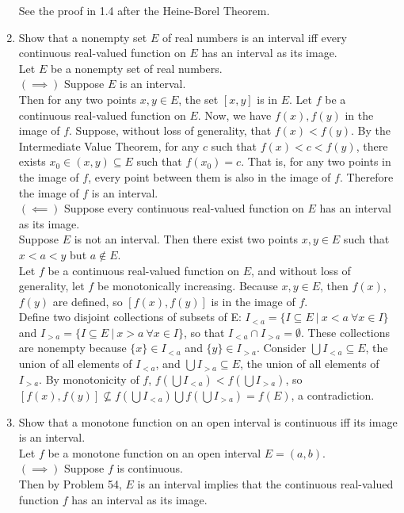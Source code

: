 \begin{enumerate}
	See the proof in 1.4 after the Heine-Borel Theorem.
	\item Show that a nonempty set $E$ of real numbers is an interval iff every continuous real-valued function on $E$ has an interval as its image.\\
	Let $E$ be a nonempty set of real numbers.\\
	$(\implies)$ Suppose $E$ is an interval.\\
	Then for any two points $x,y\in E$, the set $[x,y]$ is in $E$.
	Let $f$ be a continuous real-valued function on $E$.
	Now, we have $f(x),f(y)$ in the image of $f$.
	Suppose, without loss of generality, that $f(x)<f(y)$.
	By the Intermediate Value Theorem, for any $c$ such that $f(x)<c<f(y)$, there exists $x_0\in(x,y)\subseteq E$ such that $f(x_0)=c$.
	That is, for any two points in the image of $f$, every point between them is also in the image of $f$.
	Therefore the image of $f$ is an interval.\\
	$(\impliedby)$ Suppose every continuous real-valued function on $E$ has an interval as its image.\\
	Suppose $E$ is not an interval.
	Then there exist two points $x,y\in E$ such that $x<a<y$ but $a \notin E$.
	\\Let $f$ be a continuous real-valued function on $E$, and without loss of generality, let $f$ be monotonically increasing.
	Because $x,y\in E$, then $f(x)$,$f(y)$ are defined, so $[f(x),f(y)]$ is in the image of $f$.
	\\Define two disjoint collections of subsets of E: $I_{<a}=\{I\subseteq E\ |\ x<a \ \forall x \in I\}$ and $I_{>a}=\{I\subseteq E\ |\ x>a \ \forall x \in I\}$, so that $I_{<a}\cap I_{>a}=\emptyset$.
	These collections are nonempty because $\{x\}\in I_{<a}$ and $\{y\}\in I_{>a}$.
	Consider $\bigcup I_{<a}\subseteq E$, the union of all elements of $I_{<a}$, and $\bigcup I_{>a}\subseteq E$, the union of all elements of $I_{>a}$.
	By monotonicity of $f$, $f(\bigcup I_{<a})<f(\bigcup I_{>a})$, so $[f(x),f(y)]\not\subseteq f(\bigcup I_{<a})\bigcup f(\bigcup I_{>a})=f(E)$, a contradiction.
	\item Show that a monotone function on an open interval is continuous iff its image is an interval.\\
	Let $f$ be a monotone function on an open interval $E=(a,b)$.\\
	$(\implies)$ Suppose $f$ is continuous.\\
	Then by Problem 54, $E$ is an interval implies that the continuous real-valued function $f$ has an interval as its image.\\

\end{enumerate}
